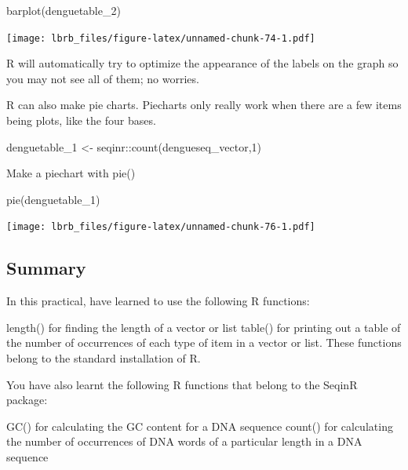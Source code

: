\documentclass[
]{book}
\newenvironment{Shaded}{\begin{snugshade}}{\end{snugshade}}
\newcommand{\DecValTok}[1]{\textcolor[rgb]{0.00,0.00,0.81}{#1}}
\newcommand{\FunctionTok}[1]{\textcolor[rgb]{0.00,0.00,0.00}{#1}}
\newcommand{\NormalTok}[1]{#1}
\newcommand{\OtherTok}[1]{\textcolor[rgb]{0.56,0.35,0.01}{#1}}
\newcommand{\SpecialCharTok}[1]{\textcolor[rgb]{0.00,0.00,0.00}{#1}}
\begin{document}
\begin{Shaded}
\begin{Highlighting}[]
\FunctionTok{barplot}\NormalTok{(denguetable\_2)}
\end{Highlighting}
\end{Shaded}

\texttt{[image: lbrb\_files/figure-latex/unnamed-chunk-74-1.pdf]}

R will automatically try to optimize the appearance of the labels on the graph so you may not see all of them; no worries.

R can also make pie charts. Piecharts only really work when there are a few items being plots, like the four bases.

\begin{Shaded}
\begin{Highlighting}[]
\NormalTok{denguetable\_1 }\OtherTok{\textless{}{-}}\NormalTok{ seqinr}\SpecialCharTok{::}\FunctionTok{count}\NormalTok{(dengueseq\_vector,}\DecValTok{1}\NormalTok{)}
\end{Highlighting}
\end{Shaded}

Make a piechart with pie()

\begin{Shaded}
\begin{Highlighting}[]
\FunctionTok{pie}\NormalTok{(denguetable\_1)}
\end{Highlighting}
\end{Shaded}

\texttt{[image: lbrb\_files/figure-latex/unnamed-chunk-76-1.pdf]}

\hypertarget{summary}{%
\subsection{Summary}\label{summary}}

In this practical, have learned to use the following R functions:

length() for finding the length of a vector or list
table() for printing out a table of the number of occurrences of each type of item in a vector or list.
These functions belong to the standard installation of R.

You have also learnt the following R functions that belong to the SeqinR package:

GC() for calculating the GC content for a DNA sequence
count() for calculating the number of occurrences of DNA words of a particular length in a DNA sequence
\end{document}
